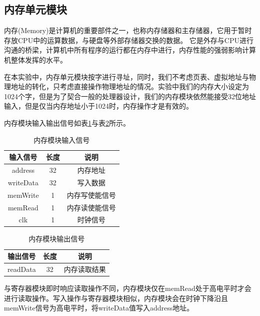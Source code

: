 \documentclass[UTF8]{ctexart}
\begin{document}
\subsection{内存单元模块}
内存(Memory)是计算机的重要部件之一，也称内存储器和主存储器，它用于暂时存放CPU中的运算数据，与硬盘等外部存储器交换的数据。 它是外存与CPU进行沟通的桥梁，计算机中所有程序的运行都在内存中进行，内存性能的强弱影响计算机整体发挥的水平。\par
在本实验中，内存单元模块按字进行寻址，同时，我们不考虑页表、虚拟地址与物理地址的转化，只考虑直接操作物理地址的情况。实验中我们的内存大小设定为1024个字，但是为了契合一般的处理器设计，我们的内存模块依然能接受32位地址输入，但是仅当内存地址小于1024时，内存操作才是有效的。\par
内存模块输入输出信号如表\ref{tab:mem-input-sig}与表\ref{tab:mem-output-sig}所示。
\begin{table}[htbp]
    \centering
    \begin{tabular}{|c|c|c|}
    \hline
    输入信号 & 长度 & 说明 \\ \hline
    address & 32 & 内存地址 \\
    writeData & 32 & 写入数据 \\
    memWrite & 1 & 内存写使能信号 \\
    memRead & 1 & 内存读使能信号 \\
    clk & 1 & 时钟信号 \\ \hline
    \end{tabular}
    \caption{内存模块输入信号}
    \label{tab:mem-input-sig}
    \end{table}
\begin{table}[htbp]
    \centering
    \begin{tabular}{|c|c|c|}
    \hline
    输出信号 & 长度 & 说明 \\ 
    \hline
    readData & 32 & 内存读取结果\\
    \hline
    \end{tabular}
    \caption{内存模块输出信号}
    \label{tab:mem-output-sig}
    \end{table}\par
与寄存器模块即时响应读取操作不同，内存模块仅在memRead处于高电平时才会进行读取操作。写入操作与寄存器模块相似，内存模块会在时钟下降沿且memWrite信号为高电平时，将writeData值写入address地址。
\end{document}
